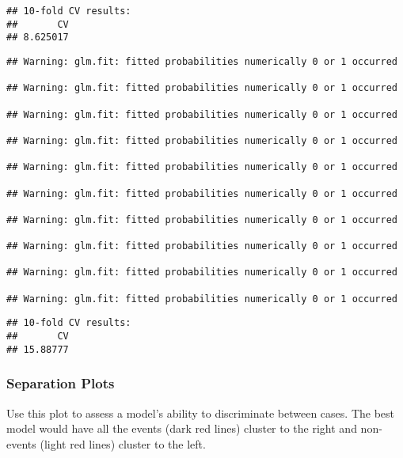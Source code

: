 \documentclass[
]{article}
\newenvironment{Shaded}{\begin{snugshade}}{\end{snugshade}}
\newcommand{\AttributeTok}[1]{\textcolor[rgb]{0.77,0.63,0.00}{#1}}
\newcommand{\DecValTok}[1]{\textcolor[rgb]{0.00,0.00,0.81}{#1}}
\newcommand{\FunctionTok}[1]{\textcolor[rgb]{0.00,0.00,0.00}{#1}}
\newcommand{\NormalTok}[1]{#1}
\newcommand{\SpecialCharTok}[1]{\textcolor[rgb]{0.00,0.00,0.00}{#1}}
\begin{document}
\begin{verbatim}
## 10-fold CV results:
##       CV 
## 8.625017
\end{verbatim}

\begin{Shaded}
\end{Shaded}

\begin{verbatim}
## Warning: glm.fit: fitted probabilities numerically 0 or 1 occurred

## Warning: glm.fit: fitted probabilities numerically 0 or 1 occurred

## Warning: glm.fit: fitted probabilities numerically 0 or 1 occurred

## Warning: glm.fit: fitted probabilities numerically 0 or 1 occurred

## Warning: glm.fit: fitted probabilities numerically 0 or 1 occurred

## Warning: glm.fit: fitted probabilities numerically 0 or 1 occurred

## Warning: glm.fit: fitted probabilities numerically 0 or 1 occurred

## Warning: glm.fit: fitted probabilities numerically 0 or 1 occurred

## Warning: glm.fit: fitted probabilities numerically 0 or 1 occurred

## Warning: glm.fit: fitted probabilities numerically 0 or 1 occurred
\end{verbatim}

\begin{verbatim}
## 10-fold CV results:
##       CV 
## 15.88777
\end{verbatim}

\hypertarget{separation-plots}{%
\subsubsection{Separation Plots}\label{separation-plots}}

Use this plot to assess a model's ability to discriminate between cases.
The best model would have all the events (dark red lines) cluster to the
right and non-events (light red lines) cluster to the left.
\end{document}
